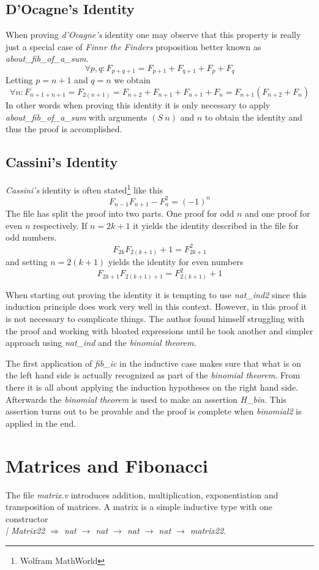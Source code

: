 \documentclass[9pt,a4paper,oneside]{article}
\begin{document}
\subsection{D'Ocagne's Identity}
When proving \textit{d'Ocagne’s} identity one may observe that this property is really just a special case of \textit{Finnr the Finders} proposition better known as \textit{about\_fib\_of\_a\_sum}.
$$\forall p,q: F_{p+q+1}=F_{p+1}+F_{q+1}+F_p+F_q$$
Letting $p=n+1$ and $q=n$ we obtain
$$\forall n: F_{n+1+n+1}=F_{2(n+1)}=F_{n+2}+F_{n+1}+F_{n+1}+F_n=F_{n+1}(F_{n+2}+F_n)$$
In other words when proving this identity it is only necessary to apply \textit{about\_fib\_of\_a\_sum} with arguments $(S\ n)$ and $n$ to obtain the identity and thus the proof is accomplished.

\subsection{Cassini's Identity}
\textit{Cassini's} identity is often stated\footnote{Wolfram MathWorld} like this
$$F_{n-1}F_{n+1}-F_n^2=(-1)^n$$
The file has split the proof into two parts. One proof for odd $n$ and one proof for even $n$ respectively.
If $n=2k+1$ it yields the identity described in the file for odd numbers.
$$F_{2k}F_{2(k+1)}+1=F_{2k+1}^2$$
and setting $n=2(k+1)$ yields the identity for even numbers
$$F_{2k+1}F_{2(k+1)+1}=F_{2(k+1)}^2+1$$

When starting out proving the identity it is tempting to use \textit{nat\_ind2} since this induction principle does work very well in this context. However, in this proof it is not necessary to complicate things. The author found himself struggling with the proof and working with bloated expressions until he took another and simpler approach using \textit{nat\_ind} and the \textit{binomial theorem}.

The first application of \textit{fib\_ic} in the inductive case makes sure that what is on the left hand side is actually recognized as part of the \textit{binomial theorem}. From there it is all about applying the induction hypotheses on the right hand side. Afterwards the \textit{binomial theorem} is used to make an assertion \textit{H\_bin}. This assertion turns out to be provable and the proof is complete when \textit{binomial2} is applied in the end.

\section{Matrices and Fibonacci}
The file \textit{matrix.v} introduces addition, multiplication, exponentiation and transposition of matrices. A matrix is a simple inductive type with one constructor \\ \textit{| Matrix22 $\Rightarrow$ nat $\rightarrow$ nat $\rightarrow$ nat $\rightarrow$ nat $\rightarrow$ matrix22}.
\end{document}
